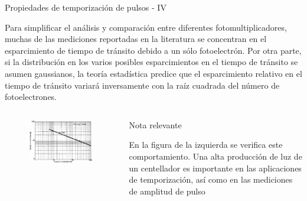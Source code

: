 \documentclass[a4paper,10pt]{beamer}
\begin{document}
\begin{frame}{Propiedades de temporización de pulsos - IV}
 \begin{justify}

 Para simplificar el análisis y comparación entre diferentes fotomultiplicadores, 
 muchas de las mediciones reportadas en la literatura se concentran en el 
 esparcimiento de tiempo de tránsito debido a un sólo fotoelectrón. Por otra parte,
 si la distribución en los varios posibles esparcimientos en el tiempo de tránsito 
 se asumen gaussianos, la teoría estadística predice que el esparcimiento relativo
 en el tiempo de tránsito variará inversamente con la raíz cuadrada del número 
 de fotoelectrones.

 \end{justify}
 
 \begin{columns}[c]
  \column{2in}
  \begin{figure}
   \center 
   \includegraphics[scale=0.3]{fig24}
  \end{figure}
  
  \column{2in}
  \begin{block}{Nota relevante}
  \begin{justify}
   En la figura de la izquierda se verifica este comportamiento. Una alta producción 
   de luz de un centellador es importante en las aplicaciones de temporización, así 
   como en las mediciones de amplitud de pulso
   \end{justify}
  \end{block}
 \end{columns}

\end{frame}
\end{document}
